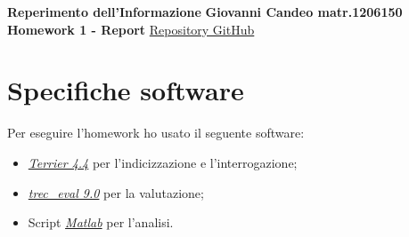 \documentclass[a4paper, 9pt]{article}
\begin{document}
\noindent
\large\textbf{Reperimento dell'Informazione} \hfill \textbf{Giovanni Candeo matr.1206150} \\
\large\textbf{Homework 1 - Report} \hfill \href{https://github.com/candeogi/HomeworkIR}{Repository GitHub \faGithub}\\
\section*{Specifiche software}
Per eseguire l'homework ho usato il seguente software:
\begin{itemize}
    \item \href{http://terrier.org/}{\textit{Terrier 4.4}} per l'indicizzazione e l'interrogazione;
    \item \href{https://trec.nist.gov/trec_eval/}{\textit{trec\_eval 9.0}} per la valutazione;
    \item Script \href{https://mathworks.com/products/matlab.html}{\textit{Matlab}} per l'analisi.
\end{itemize}
\end{document}
